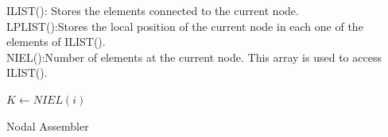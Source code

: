 \noindent
ILIST(): Stores the elements connected to the current node.\\
LPLIST():Stores the local position of the current node in each one of the elements of ILIST().\\
NIEL():Number of elements at the current node. This array is used to access ILIST().\\


\begin{algorithm}[H]
\SetAlgoLined
{}
{
$K\leftarrow NIEL(i)$
}
\caption{Nodal Assembler}
\end{algorithm}




